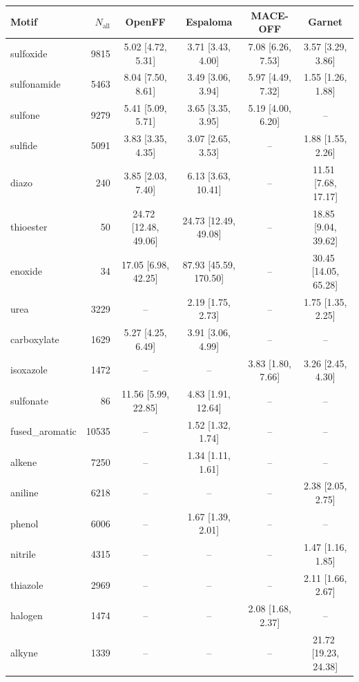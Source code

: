 \begin{table}[h!]
  \centering
  \small
  \setlength{\tabcolsep}{5pt}
  \renewcommand{\arraystretch}{1.15}
  \begin{tabular}{l r c c c c}
    \hline
    Motif & $N_\mathrm{all}$ & OpenFF & Espaloma & MACE-OFF & Garnet \\
    \hline
    sulfoxide & 9815 & 5.02\,\,[4.72, 5.31] & 3.71\,\,[3.43, 4.00] & 7.08\,\,[6.26, 7.53] & 3.57\,\,[3.29, 3.86] \\
    sulfonamide & 5463 & 8.04\,\,[7.50, 8.61] & 3.49\,\,[3.06, 3.94] & 5.97\,\,[4.49, 7.32] & 1.55\,\,[1.26, 1.88] \\
    \hdashline
    sulfone & 9279 & 5.41\,\,[5.09, 5.71] & 3.65\,\,[3.35, 3.95] & 5.19\,\,[4.00, 6.20] & -- \\
    sulfide & 5091 & 3.83\,\,[3.35, 4.35] & 3.07\,\,[2.65, 3.53] & -- & 1.88\,\,[1.55, 2.26] \\
    diazo & 240 & 3.85\,\,[2.03, 7.40] & 6.13\,\,[3.63, 10.41] & -- & 11.51\,\,[7.68, 17.17] \\
    thioester & 50 & 24.72\,\,[12.48, 49.06] & 24.73\,\,[12.49, 49.08] & -- & 18.85\,\,[9.04, 39.62] \\
    enoxide & 34 & 17.05\,\,[6.98, 42.25] & 87.93\,\,[45.59, 170.50] & -- & 30.45\,\,[14.05, 65.28] \\
    \hdashline
    urea & 3229 & -- & 2.19\,\,[1.75, 2.73] & -- & 1.75\,\,[1.35, 2.25] \\
    carboxylate & 1629 & 5.27\,\,[4.25, 6.49] & 3.91\,\,[3.06, 4.99] & -- & -- \\
    isoxazole & 1472 & -- & -- & 3.83\,\,[1.80, 7.66] & 3.26\,\,[2.45, 4.30] \\
    sulfonate & 86 & 11.56\,\,[5.99, 22.85] & 4.83\,\,[1.91, 12.64] & -- & -- \\
    \hdashline
    fused\_aromatic & 10535 & -- & 1.52\,\,[1.32, 1.74] & -- & -- \\
    alkene & 7250 & -- & 1.34\,\,[1.11, 1.61] & -- & -- \\
    aniline & 6218 & -- & -- & -- & 2.38\,\,[2.05, 2.75] \\
    phenol & 6006 & -- & 1.67\,\,[1.39, 2.01] & -- & -- \\
    nitrile & 4315 & -- & -- & -- & 1.47\,\,[1.16, 1.85] \\
    thiazole & 2969 & -- & -- & -- & 2.11\,\,[1.66, 2.67] \\
    halogen & 1474 & -- & -- & 2.08\,\,[1.68, 2.37] & -- \\
    alkyne & 1339 & -- & -- & -- & 21.72\,\,[19.23, 24.38] \\

\end{tabular}
\end{table}
